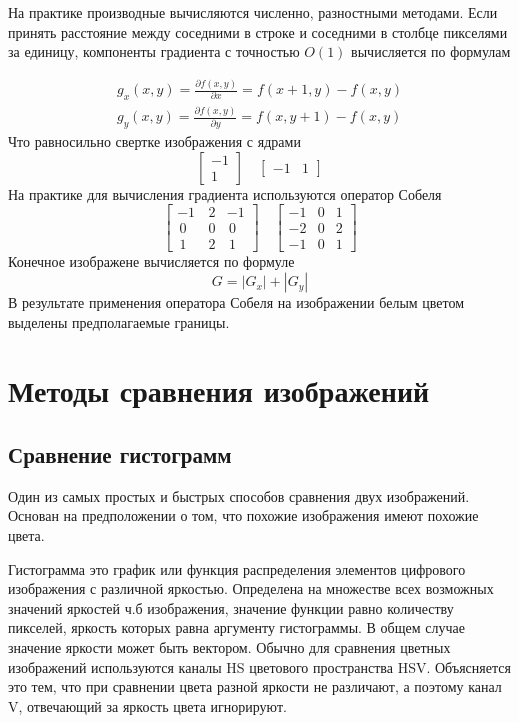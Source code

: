 \documentclass[oneside,final,14pt]{extreport}
\begin{document}
 На практике производные вычисляются численно, разностными методами. Если принять расстояние между соседними в строке и соседними в столбце пикселями за единицу, компоненты градиента с точностью $O(1)$ вычисляется по формулам

\begin{gather}
g_x(x,y) 
= 
\frac{\partial f(x,y)}
{\partial x}
=
f(x+1,y) - f(x,y)
\\
g_y(x,y) 
= 
\frac{\partial f(x,y)}
{\partial y}
=
f(x,y+1) - f(x,y)
\end{gather}
Что равносильно свертке изображения с ядрами 
\begin{equation}
\begin{bmatrix}
-1\\1
\end{bmatrix}
\quad
\begin{bmatrix}
-1 & 1
\end{bmatrix}
\end{equation}
На практике для вычисления градиента используются оператор Собеля
\begin{equation}
\begin{bmatrix}
 -1 & \,2 & -1 \\
\,0 & \,0 &\,0 \\
\,1 & \,2 &\,1
\end{bmatrix}
\quad
\begin{bmatrix}
-1 & 0 &  1 \\
-2 & 0 &  2 \\
-1 & 0 &  1
\end{bmatrix}	
\end{equation}
Конечное изображене вычисляется 	по формуле
\begin{equation}
G
=
|G_x| + |G_y|
\end{equation}
В результате применения оператора Собеля на изображении белым цветом выделены предполагаемые границы.



\chapter{Методы сравнения изображений}
\section{Сравнение гистограмм}
Один из самых простых и быстрых способов сравнения  двух изображений. Основан на предположении о том, что похожие изображения имеют похожие цвета. 

Гистограмма это график  или функция распределения элементов цифрового изображения с различной яркостью. Определена на множестве всех возможных значений яркостей ч.б изображения, значение функции равно количеству пикселей, яркость которых равна аргументу гистограммы. В общем случае значение яркости может быть вектором. Обычно для сравнения цветных изображений используются каналы HS цветового пространства HSV. Объясняется это тем, что при сравнении цвета разной яркости не различают, а поэтому канал V, отвечающий за яркость цвета игнорируют.  
\end{document}
